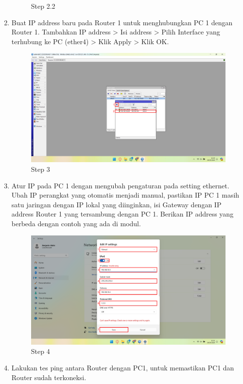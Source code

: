 \begin{center}
\begin{enumerate}
\begin{figure}[H]
			\caption{Step 2.2}
			\label{fig:Step 2.2(PC 1)}
		\end{figure}
        \item Buat IP address baru pada Router 1 untuk menghubungkan PC 1 dengan Router 1. Tambahkan IP address > Isi address > Pilih Interface yang terhubung ke PC (ether4) > Klik Apply > Klik OK.
        \begin{figure}[H]
			\centering
			\includegraphics[width=0.8\linewidth]{P4/img/pc1/Step 3.png}
			\caption{Step 3}
			\label{fig:Step 3(PC 1)}
		\end{figure}
        \item Atur IP pada PC 1 dengan mengubah pengaturan pada setting ethernet. Ubah IP perangkat yang otomatis menjadi manual, pastikan IP PC 1 masih satu jaringan dengan IP lokal yang diinginkan, isi Gateway dengan IP address Router 1 yang tersambung dengan PC 1. Berikan IP address yang berbeda dengan contoh yang ada di modul.
        \begin{figure}[H]
			\centering
			\includegraphics[width=0.8\linewidth]{P4/img/pc1/Step 4.png}
			\caption{Step 4}
			\label{fig:Step 4(PC 1)}
		\end{figure}
        \item Lakukan tes ping antara Router dengan PC1, untuk memastikan PC1 dan Router sudah terkoneksi.
        \begin{figure}[H]

\end{figure}
\end{enumerate}
\end{center}

